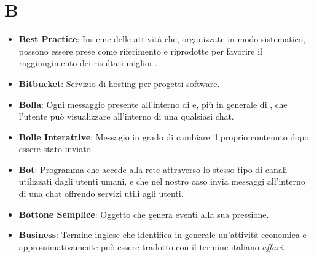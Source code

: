 \section{B}
\begin{itemize}
	\item
	\textbf{Best Practice}: Insieme delle attività che, organizzate in modo sistematico, possono essere prese come riferimento e riprodotte per favorire il raggiungimento dei risultati migliori.
	\item
	\textbf{Bitbucket}: Servizio di hosting per progetti software.
	\item
	\textbf{Bolla}: Ogni messaggio presente all'interno di  e, più in generale di , che l'utente può visualizzare all'interno di una qualsiasi chat.
	\item
	\textbf{Bolle Interattive}: Messagio in grado di cambiare il proprio contenuto dopo essere stato inviato.
	\item
	\textbf{Bot}: Programma che accede alla rete attraverso lo stesso tipo di canali utilizzati dagli utenti umani, e che nel nostro caso invia messaggi all'interno di una chat offrendo servizi utili agli utenti.
	\item
	\textbf{Bottone Semplice}: Oggetto che genera eventi alla sua pressione.
	\item
	\textbf{Business}: Termine inglese che identifica in generale un'attività economica e approssimativamente può essere tradotto con il termine italiano \textit{affari}.
\end{itemize}
\newpage